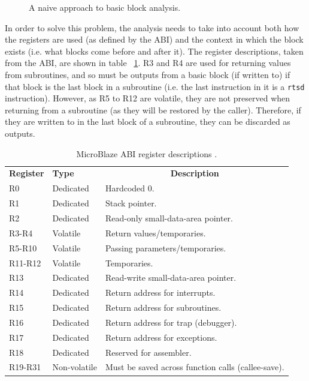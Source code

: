 \documentclass{UoYCSproject}
\newenvironment{monospace}{\ttfamily\small}{\par}
\begin{document}
\begin{figure}[H]
  \begin{center}
    \begin{minipage}{0.5\linewidth}
      \begin{monospace}
      
      \end{monospace}
    \end{minipage}
  \end{center}

  \caption{A naive approach to basic block analysis.}
  \label{fig:analysisNaiveApproach}
\end{figure}

In order to solve this problem, the analysis needs to take into account both how the registers are used (as defined by the
ABI) and the context in which the block exists (i.e. what blocks come before and after it).
The register descriptions, taken from the ABI, are shown in table ~\ref{table:abi}. R3 and R4 are used for returning values from
subroutines, and so must be outputs from a basic block (if written to) if that block is the last block in a subroutine
(i.e. the last instruction in it is a \texttt{rtsd} instruction). However, as R5 to R12 are volatile, they are not preserved
when returning from a subroutine (as they will be restored by the caller). Therefore, if they are written to in the last block
of a subroutine, they can be discarded as outputs.

\begin{table}[H]
\centering
\begin{tabular}{ |p{2cm}|p{3cm}|p{8cm}| }
\textbf{Register} & \textbf{Type} & \multicolumn{1}{c}{\textbf{Description}} \\
R0       & Dedicated    & Hardcoded 0. \\[0.05cm]
R1       & Dedicated    & Stack pointer. \\[0.05cm]
R2       & Dedicated    & Read-only small-data-area pointer. \\[0.05cm]
R3-R4    & Volatile     & Return values/temporaries. \\[0.05cm]
R5-R10   & Volatile     & Passing parameters/temporaries. \\[0.05cm]
R11-R12  & Volatile     & Temporaries. \\[0.05cm]
R13      & Dedicated    & Read-write small-data-area pointer. \\[0.05cm]
R14      & Dedicated    & Return address for interrupts. \\[0.05cm]
R15      & Dedicated    & Return address for subroutines. \\[0.05cm]
R16      & Dedicated    & Return address for trap (debugger). \\[0.05cm]
R17      & Dedicated    & Return address for exceptions. \\[0.05cm]
R18      & Dedicated    & Reserved for assembler. \\[0.05cm]
R19-R31  & Non-volatile & Must be saved across function calls (callee-save).
\end{tabular}
\caption{MicroBlaze ABI register descriptions \cite{microblaze-ref}.}
\label{table:abi}
\end{table}
\end{document}

